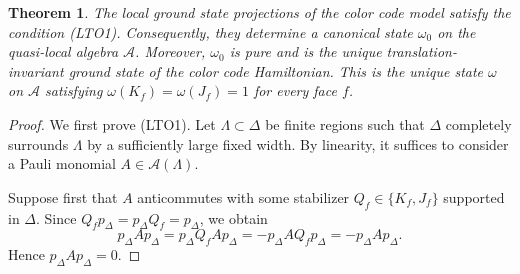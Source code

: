 \documentclass[a4paper,11pt]{article}
\newtheorem{theorem}{Theorem}[section]
\theoremstyle{definition}
\theoremstyle{remark}
\theoremstyle{remark}
\begin{document}
\begin{theorem}  \label{prop:GS}
    The local ground state projections of the color code model satisfy the condition {\rm (LTO1)}. Consequently, they determine a canonical state $\omega_0$ on the quasi-local algebra $\mathcal A$. Moreover, $\omega_0$ is pure and is the unique translation-invariant ground state of the color code Hamiltonian. This is the unique state $\omega$ on $\mathcal A$ satisfying $\omega(K_f)=\omega(J_f)=1$ for every face $f$.
\end{theorem}


\begin{proof}
We first prove {\rm (LTO1)}. Let $\Lambda\subset\Delta$ be finite regions such that $\Delta$ completely surrounds $\Lambda$ by a sufficiently large fixed width. By linearity, it suffices to consider a Pauli monomial $A\in\mathcal A(\Lambda)$.

Suppose first that $A$ anticommutes with some stabilizer $Q_f\in\{K_f,J_f\}$ supported in $\Delta$. Since $Q_f p_\Delta=p_\Delta Q_f=p_\Delta$, we obtain
\[
    p_\Delta A p_\Delta = p_\Delta Q_f A p_\Delta = -p_\Delta A Q_f p_\Delta = -p_\Delta A p_\Delta.
\]
Hence $p_\Delta A p_\Delta=0$. 


\end{proof}
\end{document}
